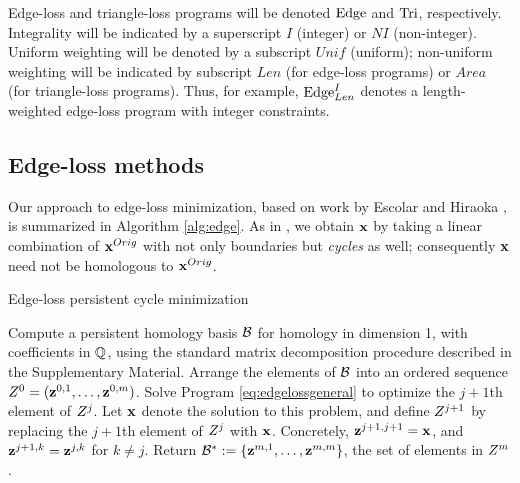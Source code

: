 Edge-loss and triangle-loss programs will be denoted $\mathrm{Edge}$ and $\mathrm{Tri}$, respectively.  Integrality will be indicated by a superscript $I$ (integer) or $NI$ (non-integer).  Uniform weighting will be denoted by a subscript $Unif$ (uniform); non-uniform weighting will be indicated by subscript $Len$ (for edge-loss programs) or $Area$ (for triangle-loss programs).  Thus, for example, $\mathrm{Edge}^{I}_{Len}$ denotes a length-weighted edge-loss program with integer constraints.

\subsection{Edge-loss methods}
\label{sec:edgelossmethods}

 
Our approach to edge-loss minimization, based on work by Escolar and Hiraoka \cite{Escolar2016}, is summarized in Algorithm \ref{alg:edge}.  As in \cite{Escolar2016}, we obtain $\mathbf{x}$  by taking a linear combination of $\mathbf{x}^{Orig}$ with not only boundaries but \emph{cycles} as well; consequently $\mathbf{x}$ need not be homologous to $\mathbf{x}^{Orig}$.  
\begin{algorithm}
\caption{Edge-loss persistent cycle minimization}
\label{alg:edge}
\begin{algorithmic}[1]
\STATE Compute a persistent homology basis $\mathcal B$ for homology in dimension 1, with coefficients in $\mathbb{Q}$,  using the standard matrix decomposition procedure described in the Supplementary Material. Arrange the elements of $\mathcal B$ into an ordered sequence $Z^0 = (\mathbf{z}^{0,1}, \ldots, \mathbf{z}^{0,m})$.
\STATE Solve Program \eqref{eq:edgelossgeneral} to optimize the $j+1$th element of $Z^{j}$.  Let $\mathbf{x}$ denote the solution to this problem, and define $Z^{j+1}$ by replacing the $j+1$th element of $Z^{j}$ with $\mathbf{x}$.  Concretely, $\mathbf{z}^{j+1,j+1} = \mathbf{x}$, and $\mathbf{z}^{j+1,k} = \mathbf{z}^{j,k}$ for $k \neq j$.
\ENDFOR
\STATE Return $\mathcal B^*: = \{\mathbf{z}^{m,1}, \ldots, \mathbf{z}^{m,m}\}$, the set of elements in $Z^m$.
\end{algorithmic}
\end{algorithm}

